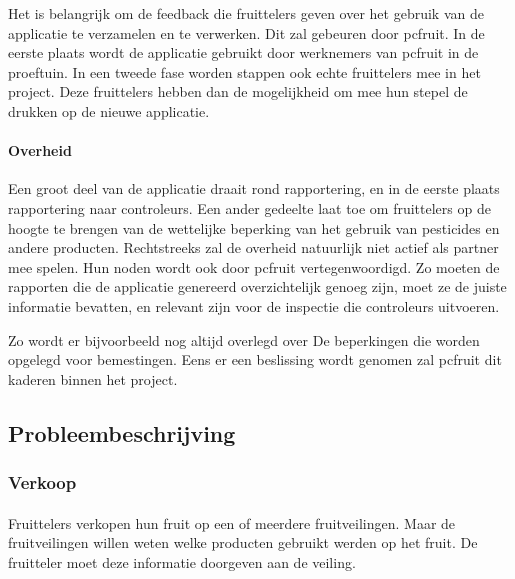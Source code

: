 Het is belangrijk om de feedback die fruittelers geven over het gebruik van de applicatie te
verzamelen en te verwerken. Dit zal gebeuren door pcfruit. In de eerste plaats wordt de
applicatie gebruikt door werknemers van pcfruit in de proeftuin. In een tweede fase worden
stappen ook echte fruittelers mee in het project. Deze fruittelers hebben dan de mogelijkheid om mee
hun stepel de drukken op de nieuwe applicatie.

\paragraph {Overheid} Een groot deel van de applicatie draait rond rapportering, en in de
eerste plaats rapportering naar controleurs. Een ander gedeelte laat toe om fruittelers op de
hoogte te brengen van de wettelijke beperking van het gebruik van pesticides en andere
producten. Rechtstreeks zal de overheid natuurlijk niet actief als partner mee spelen. Hun
noden wordt ook door pcfruit vertegenwoordigd. Zo moeten de rapporten die de applicatie
genereerd overzichtelijk genoeg zijn, moet ze de juiste informatie bevatten, en relevant
zijn voor de inspectie die controleurs uitvoeren.

Zo wordt er bijvoorbeeld nog altijd overlegd over De beperkingen die worden opgelegd voor
bemestingen. Eens er een beslissing wordt genomen zal pcfruit dit kaderen binnen het
project.


\subsection {Probleembeschrijving}

\subsubsection {Verkoop}

\paragraph {} Fruittelers verkopen hun fruit op een of meerdere fruitveilingen. Maar de
fruitveilingen willen weten welke producten gebruikt werden op het fruit. De fruitteler moet
deze informatie doorgeven aan de veiling.

